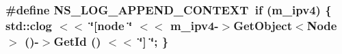 \subsubsection[{\texorpdfstring{N\+S\+\_\+\+L\+O\+G\+\_\+\+A\+P\+P\+E\+N\+D\+\_\+\+C\+O\+N\+T\+E\+XT}{NS_LOG_APPEND_CONTEXT}}]{\setlength{\rightskip}{0pt plus 5cm}\#define N\+S\+\_\+\+L\+O\+G\+\_\+\+A\+P\+P\+E\+N\+D\+\_\+\+C\+O\+N\+T\+E\+XT~{\bf if} (m\+\_\+ipv4) \{ std\+::clog $<$$<$ \char`\"{}\mbox{[}node \char`\"{} $<$$<$ m\+\_\+ipv4-\/$>$Get\+Object$<$Node$>$ ()-\/$>$Get\+Id () $<$$<$ \char`\"{}\mbox{]} \char`\"{}; \}}\hypertarget{aodv-routing-protocol_8cc_abe50035652d407c40bdaef78214c4955}{}\label{aodv-routing-protocol_8cc_abe50035652d407c40bdaef78214c4955}
